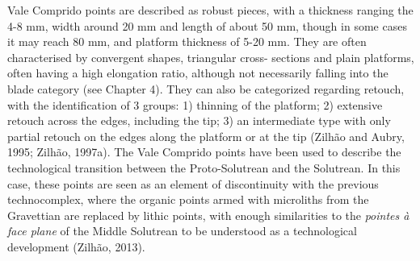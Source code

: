 \documentclass[12pt,twoside]{reedthesis}
\begin{document}
Vale Comprido points are described as robust pieces, with a thickness ranging the 4-8 mm, width around 20 mm and length of about 50 mm, though in some cases it may reach 80 mm, and platform thickness of 5-20 mm. They are often characterised by convergent shapes, triangular cross- sections and plain platforms, often having a high elongation ratio, although not necessarily falling into the blade category (see Chapter 4). They can also be categorized regarding retouch, with the identification of 3 groups: 1) thinning of the platform; 2) extensive retouch across the edges, including the tip; 3) an intermediate type with only partial retouch on the edges along the platform or at the tip (Zilhão and Aubry, 1995; Zilhão, 1997a). The Vale Comprido points have been used to describe the technological transition between the Proto-Solutrean and the Solutrean. In this case, these points are seen as an element of discontinuity with the previous technocomplex, where the organic points armed with microliths from the Gravettian are replaced by lithic points, with enough similarities to the \emph{pointes à face plane} of the Middle Solutrean to be understood as a technological development (Zilhão, 2013).
\end{document}
